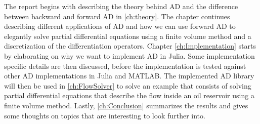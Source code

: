 The report begins with describing the theory behind AD and the difference between backward and forward AD in \autoref{ch:theory}. The chapter continues describing different applications of AD and how we can use forward AD to elegantly solve partial differential equations using a finite volume method and a discretization of the differentiation operators. Chapter \ref{ch:Implementation} starts by elaborating on why we want to implement AD in Julia. Some implementation specific details are then discussed, before the implementation is tested against other AD implementations in Julia and MATLAB. The implemented AD library will then be used in \autoref{ch:FlowSolver} to solve an example that consists of solving partial differential equations that describe the flow inside an oil reservoir using a finite volume method. Lastly, \autoref{ch:Conclusion} summarizes the results and gives some thoughts on topics that are interesting to look further into.

